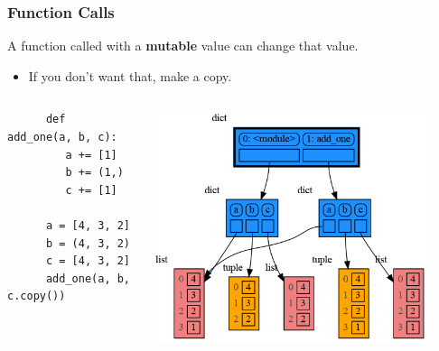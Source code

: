 \documentclass[10pt, colorlinks=true, urlcolor=blue]{beamer}
\begin{document}
\begin{frame}[fragile]
\frametitle{Function Calls}
  A function called with a \textbf{mutable} value can change that value.
  \begin{itemize}
  \item If you don't want that, make a copy.
  \end{itemize}

  \begin{columns}
    \begin{verbatim}
      def add_one(a, b, c):
         a += [1]
         b += (1,)
         c += [1]
         
      a = [4, 3, 2]
      b = (4, 3, 2)
      c = [4, 3, 2]
      add_one(a, b, c.copy())
    \end{verbatim}
    \begin{center}\includegraphics[width=0.9\textwidth]{figures/function_call.png}\end{center}
  \end{columns}
\end{frame}
\end{document}
